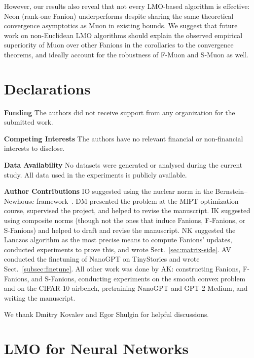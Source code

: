 \documentclass[smallextended,referee,envcountsect]{svjour3}
\newcommand{\sectionref}[1]{Sect.~\ref{#1}}
\begin{document}
 However, our results also reveal that not every LMO-based algorithm is effective: Neon (rank-one Fanion) underperforms despite sharing the same theoretical convergence asymptotics as Muon in existing bounds. We suggest that future work on non-Euclidean LMO algorithms should explain the observed empirical superiority of Muon over other Fanions in the corollaries to the convergence theorems, and ideally account for the robustness of F-Muon and S-Muon as well.

\section*{Declarations}

\noindent\textbf{Funding} The authors did not receive support from any organization for the submitted work.

\noindent\textbf{Competing Interests} The authors have no relevant financial or non-financial interests to disclose.

\noindent\textbf{Data Availability} No datasets were generated or analysed during the current study. All data used in the experiments is publicly available.

\noindent\textbf{Author Contributions} IO suggested using the nuclear norm in the Bernstein--Newhouse framework~\cite{bernstein2024oldoptimizernewnorm}. DM presented the problem at the MIPT optimization course, supervised the project, and helped to revise the manuscript. IK suggested using composite norms (though not the ones that induce Fanions, F-Fanions, or S-Fanions) and helped to draft and revise the manuscript. NK suggested the Lanczos algorithm as the most precise means to compute Fanions' updates, conducted experiments to prove this, and wrote \sectionref{sec:matrix-side}. AV conducted the finetuning of NanoGPT on TinyStories and wrote \sectionref{subsec:finetune}. All other work was done by AK: constructing Fanions, F-Fanions, and S-Fanions, conducting experiments on the smooth convex problem and on the CIFAR-10 airbench, pretraining NanoGPT and GPT-2 Medium, and writing the manuscript.

\begin{acknowledgements}
We thank Dmitry Kovalev and Egor Shulgin for helpful discussions.
\end{acknowledgements}



 
 \appendix
 \section{LMO for Neural Networks}\label{sec:lmo_for_nn}
 
\end{document}
